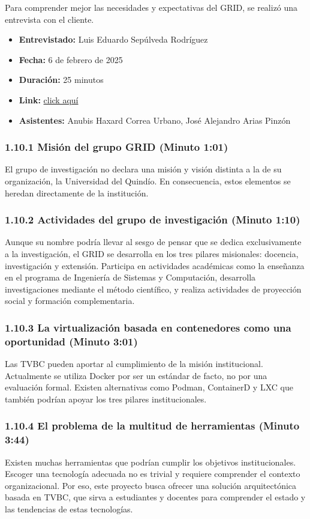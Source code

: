 Para comprender mejor las necesidades y expectativas del GRID, se realizó una entrevista con el cliente.

\begin{itemize}
  \item \textbf{Entrevistado:} Luis Eduardo Sepúlveda Rodríguez
  \item \textbf{Fecha:} 6 de febrero de 2025
  \item \textbf{Duración:} 25 minutos
  \item \textbf{Link:} \href{https://drive.google.com/file/d/1rIc9xOsyDqumlTV-QXcw0inPyIbSEHLz/view?usp=sharing}{click aquí}
  \item \textbf{Asistentes:} Anubis Haxard Correa Urbano, José Alejandro Arias Pinzón
\end{itemize}

\subsubsection*{1.10.1 Misión del grupo GRID (Minuto 1:01)}
El grupo de investigación no declara una misión y visión distinta a la de su organización, la Universidad del Quindío. En consecuencia, estos elementos se heredan directamente de la institución.

\subsubsection*{1.10.2 Actividades del grupo de investigación (Minuto 1:10)}
Aunque su nombre podría llevar al sesgo de pensar que se dedica exclusivamente a la investigación, el GRID se desarrolla en los tres pilares misionales: docencia, investigación y extensión. Participa en actividades académicas como la enseñanza en el programa de Ingeniería de Sistemas y Computación, desarrolla investigaciones mediante el método científico, y realiza actividades de proyección social y formación complementaria.

\subsubsection*{1.10.3 La virtualización basada en contenedores como una oportunidad (Minuto 3:01)}
Las TVBC pueden aportar al cumplimiento de la misión institucional. Actualmente se utiliza Docker por ser un estándar de facto, no por una evaluación formal. Existen alternativas como Podman, ContainerD y LXC que también podrían apoyar los tres pilares institucionales.

\subsubsection*{1.10.4 El problema de la multitud de herramientas (Minuto 3:44)}
Existen muchas herramientas que podrían cumplir los objetivos institucionales. Escoger una tecnología adecuada no es trivial y requiere comprender el contexto organizacional. Por eso, este proyecto busca ofrecer una solución arquitectónica basada en TVBC, que sirva a estudiantes y docentes para comprender el estado y las tendencias de estas tecnologías.

